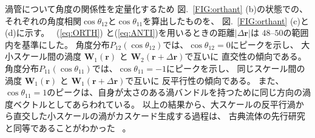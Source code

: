 \documentclass[12pt,a4paper]{jbook}
\begin{document}
			渦管について角度の関係性を定量化するため
			図.~\ref{FIG:orthant} (b)の状態での、
			それぞれの角度相関$\cos \theta_{12}$と$\cos \theta_{11}$を算出したものを、
			図.~\ref{FIG:orthant} (c)と(d)に示す。
			~(\ref{eq:ORTH}) と(\ref{eq:ANTI})を用いるときの距離$|\Delta\bm{r}|$は
			$48$--$50$の範囲内を基準にした。
			角度分布$P_{12}(\cos \theta_{12})$では、$\cos \theta_{12}=0$にピークを示し、
			大小スケール間の渦度 $\bm{W}_1(\bm{r})$ と $\bm{W}_2(\bm{r}+\Delta\bm{r})$で互いに
			直交性の傾向である。
			角度分布$P_{11}(\cos\theta_{11})$では、$\cos\theta_{11}=-1$にピークを示し、
			同じスケール間の渦度 $\bm{W}_1(\bm{r})$ と $\bm{W}_1(\bm{r}+\Delta\bm{r})$で互いに
			反平行性の傾向である。
            また、$\cos\theta_{11}=1$のピークは、自身が太さのある渦バンドルを持つために同じ方向の渦度ベクトルとしてあらわれている。
			以上の結果から、大スケールの反平行渦から直交した小スケールの渦がカスケード生成する過程は、
            古典流体の先行研究と同等であることがわかった
			~\cite{Goto2}。
\end{document}
